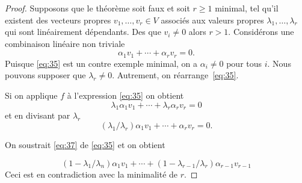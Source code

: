 \begin{proof}
  Supposons que le théorème soit faux et soit $r≥1$ minimal, tel qu'il existent des vecteurs propres $v_1,\dots,v_r ∈V$  associés aux valeurs propres $λ_1,\dots,λ_r$ qui sont linéairement dépendants. Des que $v_i ≠0$ alors $r>1$.
  Considérons une combinaison linéaire non triviale
  \begin{equation}
    \label{eq:35}
    α_1 v_1 + \cdots + α_r v_r = 0.
  \end{equation}
  Puisque \eqref{eq:35} est un contre exemple minimal, on a $α_i≠0$ pour tous $i$. Nous pouvons supposer que $λ_r ≠0$. Autrement, on réarrange~\eqref{eq:35}. 

  Si on applique $f$ à l'expression \eqref{eq:35} on obtient
  \begin{displaymath}
    λ_1 α_1 v_1 + \cdots + λ_rα_r v_r = 0
  \end{displaymath}
  et en divisant par $λ_r$
  \begin{equation}
    \label{eq:37}
    (λ_1/λ_r) α_1 v_1 + \cdots + α_r v_r = 0.
  \end{equation}

  On soustrait \eqref{eq:37} de \eqref{eq:35} et on obtient

  \begin{displaymath}
    (1- λ_1/λ_n)α_1 v_1 + \cdots + (1- λ_{r-1}/λ_r)α_{r-1} v_{r-1}
  \end{displaymath} Ceci est en contradiction avec la minimalité de $r$.
\end{proof}


